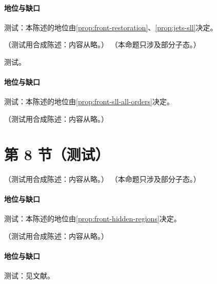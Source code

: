 \paragraph{地位与缺口}测试：本陈述的地位由\cref{prop:front-restoration}、\cref{prop:jets-sll}决定。

\begin{proposition}\label{prop:front-sll-closed-form}
（测试用合成陈述：内容从略。）
（本命题只涉及部分子态。）
\end{proposition}
\begin{proofsketch}测试。\end{proofsketch}
\paragraph{地位与缺口}测试：本陈述的地位由\cref{prop:front-sll-all-orders}决定。

\begin{example}[由闭式读出第一个超领头对数]\label{ex:front-sll-first}
（测试用合成陈述：内容从略。）
\end{example}

\section{第 8 节（测试）}\label{sec:front-nlp-tmd}

\begin{proposition}\label{prop:front-restoration}
（测试用合成陈述：内容从略。）
（本命题只涉及部分子态。）
\end{proposition}
\paragraph{地位与缺口}测试：本陈述的地位由\cref{prop:front-hidden-regions}决定。

\begin{proposition}\label{prop:front-jettiness-cvl}
（测试用合成陈述：内容从略。）
\end{proposition}
\paragraph{地位与缺口}测试：见文献。

